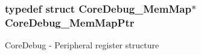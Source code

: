 \subsubsection[{\texorpdfstring{Core\+Debug\+\_\+\+Mem\+Map\+Ptr}{CoreDebug_MemMapPtr}}]{\setlength{\rightskip}{0pt plus 5cm}typedef struct {\bf Core\+Debug\+\_\+\+Mem\+Map}$\ast$ {\bf Core\+Debug\+\_\+\+Mem\+Map\+Ptr}}\hypertarget{group___core_debug___peripheral_gaa548220bc91b12bd49065fe752579fcd}{}\label{group___core_debug___peripheral_gaa548220bc91b12bd49065fe752579fcd}
Core\+Debug -\/ Peripheral register structure 